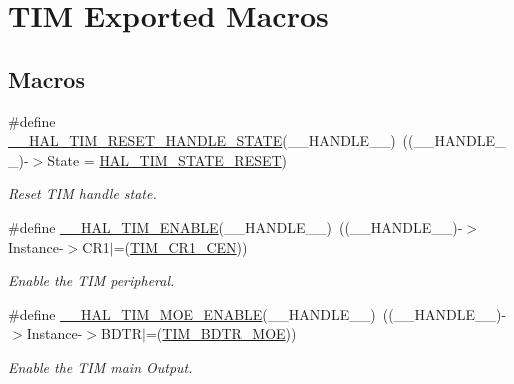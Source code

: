 \hypertarget{group___t_i_m___exported___macros}{}\section{T\+IM Exported Macros}
\label{group___t_i_m___exported___macros}
\subsection*{Macros}
\begin{DoxyCompactItemize}
\item 
\#define \mbox{\hyperlink{group___t_i_m___exported___macros_gace20fd4e38231b9682fbc83a80ec19a3}{\+\_\+\+\_\+\+H\+A\+L\+\_\+\+T\+I\+M\+\_\+\+R\+E\+S\+E\+T\+\_\+\+H\+A\+N\+D\+L\+E\+\_\+\+S\+T\+A\+TE}}(\+\_\+\+\_\+\+H\+A\+N\+D\+L\+E\+\_\+\+\_\+)~((\+\_\+\+\_\+\+H\+A\+N\+D\+L\+E\+\_\+\+\_\+)-\/$>$State = \mbox{\hyperlink{group___t_i_m___exported___types_ggae0994cf5970e56ca4903e9151f40010ca28011b79e60b74a6c55947c505c51cbc}{H\+A\+L\+\_\+\+T\+I\+M\+\_\+\+S\+T\+A\+T\+E\+\_\+\+R\+E\+S\+ET}})
\begin{DoxyCompactList}\small\item\em Reset T\+IM handle state. \end{DoxyCompactList}\item 
\#define \mbox{\hyperlink{group___t_i_m___exported___macros_ga1a90544705059e9f19f991651623b0c0}{\+\_\+\+\_\+\+H\+A\+L\+\_\+\+T\+I\+M\+\_\+\+E\+N\+A\+B\+LE}}(\+\_\+\+\_\+\+H\+A\+N\+D\+L\+E\+\_\+\+\_\+)~((\+\_\+\+\_\+\+H\+A\+N\+D\+L\+E\+\_\+\+\_\+)-\/$>$Instance-\/$>$C\+R1$\vert$=(\mbox{\hyperlink{group___peripheral___registers___bits___definition_ga93d86355e5e3b399ed45e1ca83abed2a}{T\+I\+M\+\_\+\+C\+R1\+\_\+\+C\+EN}}))
\begin{DoxyCompactList}\small\item\em Enable the T\+IM peripheral. \end{DoxyCompactList}\item 
\#define \mbox{\hyperlink{group___t_i_m___exported___macros_ga04890dcef3ed061854721a3672585607}{\+\_\+\+\_\+\+H\+A\+L\+\_\+\+T\+I\+M\+\_\+\+M\+O\+E\+\_\+\+E\+N\+A\+B\+LE}}(\+\_\+\+\_\+\+H\+A\+N\+D\+L\+E\+\_\+\+\_\+)~((\+\_\+\+\_\+\+H\+A\+N\+D\+L\+E\+\_\+\+\_\+)-\/$>$Instance-\/$>$B\+D\+TR$\vert$=(\mbox{\hyperlink{group___peripheral___registers___bits___definition_ga277a096614829feba2d0a4fbb7d3dffc}{T\+I\+M\+\_\+\+B\+D\+T\+R\+\_\+\+M\+OE}}))
\begin{DoxyCompactList}\small\item\em Enable the T\+IM main Output. \end{DoxyCompactList}\item 

\end{DoxyCompactItemize}
